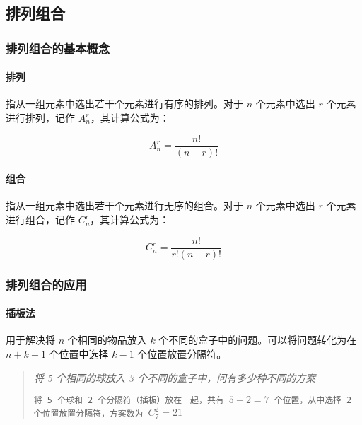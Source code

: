 \subsection{排列组合}

\subsubsection{排列组合的基本概念}

\paragraph{排列} 指从一组元素中选出若干个元素进行有序的排列。对于 $n$ 个元素中选出 $r$ 个元素进行排列，记作 $A_n^r$，其计算公式为：

\[
    A_n^r = \frac{n!}{(n-r)!}
\]

\paragraph{组合} 指从一组元素中选出若干个元素进行无序的组合。对于 $n$ 个元素中选出 $r$ 个元素进行组合，记作 $C_n^r$，其计算公式为：

\[
    C_n^r = \frac{n!}{r!(n-r)!}
\]

\subsubsection{排列组合的应用}

\paragraph{插板法} 用于解决将 $n$ 个相同的物品放入 $k$ 个不同的盒子中的问题。可以将问题转化为在 $n+k-1$ 个位置中选择 $k-1$ 个位置放置分隔符。

\begin{quote}
    \begin{tcolorbox}[colback=red!5!white, colframe=red!75!black, title=插板法]
        \textit{将 5 个相同的球放入 3 个不同的盒子中，问有多少种不同的方案}
        \tcblower%
        \begin{center}
        \end{center}
        \texttt{将 5 个球和 2 个分隔符（插板）放在一起，共有 $5 + 2 = 7$ 个位置，从中选择 2 个位置放置分隔符，方案数为 $C_7^2 = 21$}
    \end{tcolorbox}
\end{quote}

